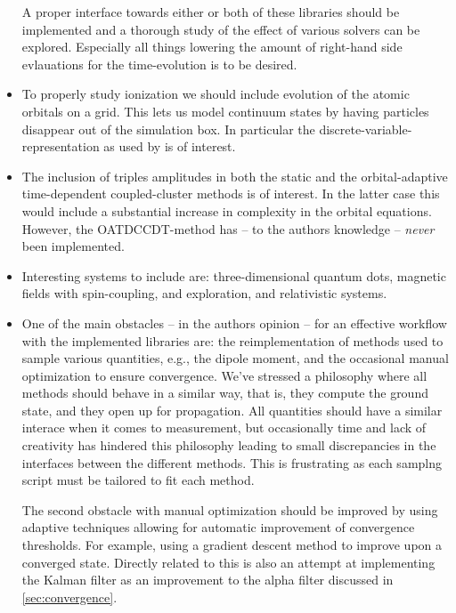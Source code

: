 \begin{itemize}
                    A proper interface towards either or both of these libraries
                    should be implemented and a thorough study of the effect of
                    various solvers can be explored.
                    Especially all things lowering the amount of right-hand side
                    evlauations for the time-evolution is to be desired.
                \item To properly study ionization we should include evolution
                    of the atomic orbitals on a grid.
                    This lets us model continuum states by having particles
                    disappear out of the simulation box.
                    In particular the discrete-variable-representation as used
                    by \citeauthor{miyagi_and_madsen} \cite{miyagi_and_madsen}
                    is of interest.
                \item The inclusion of triples amplitudes in both the static and
                    the orbital-adaptive time-dependent
                    coupled-cluster methods is of interest.
                    In the latter case this would include a substantial
                    increase in complexity in the orbital equations.
                    However, the OATDCCDT-method has -- to the authors knowledge
                    -- \emph{never} been implemented.
                \item Interesting systems to include are: three-dimensional
                    quantum dots, magnetic fields with spin-coupling, and
                    exploration, and relativistic systems.
                \item One of the main obstacles -- in the authors opinion -- for
                    an effective workflow with the implemented libraries are: the
                    reimplementation of methods used to sample various
                    quantities, e.g., the dipole moment, and the occasional
                    manual optimization to ensure convergence.
                    We've stressed a philosophy where all methods should behave
                    in a similar way, that is, they compute the ground state,
                    and they open up for propagation.
                    All quantities should have a similar interace when it comes
                    to measurement, but occasionally time and lack of creativity
                    has hindered this philosophy leading to small discrepancies
                    in the interfaces between the different methods.
                    This is frustrating as each samplng script must be tailored
                    to fit each method.

                    The second obstacle with manual optimization should be
                    improved by using adaptive techniques allowing for automatic
                    improvement of convergence thresholds.
                    For example, using a gradient descent method to improve upon
                    a converged state.
                    Directly related to this is also an attempt at implementing
                    the Kalman filter as an improvement to the alpha filter
                    discussed in \autoref{sec:convergence}.
            \end{itemize}

